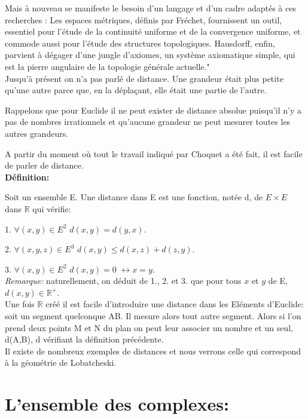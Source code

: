 \documentclass[a4paper, 12pt, twoside]{book}
\begin{document}
Mais à nouveau se manifeste le besoin d'un langage et d'un cadre adaptés à
ces recherches : Les espaces métriques, définis par Fréchet,
fournissent un outil, essentiel pour l'étude de la continuité uniforme et de la convergence uniforme, et commode aussi pour l'étude des structures topologiques. Hausdorff, enfin, parvient à dégager d'une jungle d'axiomes, un système axiomatique simple, qui est la pierre angulaire de la topologie générale actuelle."\\



  
  Jusqu'à présent on n'a pas parlé de distance. Une grandeur était plus petite qu'une autre parce que, en la déplaçant, elle était une partie de l'autre.\
  
  Rappelons que pour Euclide il ne peut exister de distance absolue puisqu'il n'y a pas de nombres irrationnels et qu'aucune grandeur ne peut mesurer toutes les autres grandeurs.\
  
  A partir du moment où tout le travail indiqué par Choquet a été fait, il est facile de parler de distance.\\
  
 \newpage  \textbf{Définition:}\
  
  Soit un ensemble E. Une distance dans E est une fonction, notée d, de $E\times E$ dans $\mathbb{R}$ qui vérifie:\
  
  1. $\forall (x,y) \in E^{2}$ $d(x,y)=d(y,x)$.\
  
  2.  $\forall (x,y,z) \in E^{3}$ $d(x,y)\leq d(x,z)+d(z,y)$.\
  
  3. $\forall (x,y) \in E^{2}$ $d(x,y)=0 $ $\longleftrightarrow x=y$.\\
  
  \textit{Remarque:} naturellement, on déduit de 1., 2. et 3. que pour tous $x$ et $y$ de E, $d(x,y)\in \mathbb{R^{+}}$.\\
  
  Une fois $\mathbb{R}$ créé il est facile d'introduire une distance dans les Eléments d'Euclide: soit un segment quelconque AB. Il mesure alors tout autre segment. Alors si l'on prend deux points M et N du plan on peut leur associer un nombre et un seul, d(A,B), d vérifiant la définition précédente.\\
  
  Il existe de nombreux exemples de distances et nous verrons celle qui correspond à la géométrie de Lobatcheski.\\
  
  \chapter{L'ensemble des complexes:}
  
\end{document}
